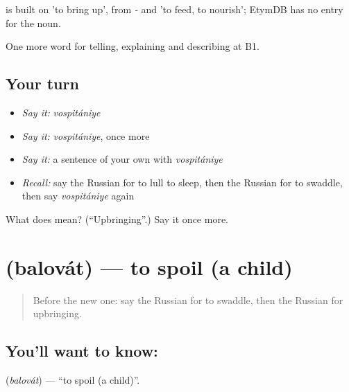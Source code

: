 \begin{cousinweb}
\emph{} is built on \emph{} 'to bring up', from \emph{-} and \emph{} 'to feed, to nourish'; EtymDB has no entry for the noun.
\end{cousinweb}

\begin{grammarlens}[title={What you've built}]
One more word for telling, explaining and describing at B1.
\end{grammarlens}

\subsection*{Your turn}
\begin{itemize}
\raggedright
  \item \emph{Say it:} \emph{vospitániye}
  \item \emph{Say it:} \emph{vospitániye}, once more
  \item \emph{Say it:} a sentence of your own with \emph{vospitániye}
  \item \emph{Recall:} say the Russian for to lull to sleep, then the Russian for to swaddle, then say \emph{vospitániye} again
\end{itemize}

\begin{tcolorbox}[breakable,colback=teal!4,colframe=teal!35!black,title={Before you move on}]
What does  mean? (\textquotedblleft{}Upbringing\textquotedblright{}.) Say it once more.
\end{tcolorbox}
\section[\texorpdfstring{\ru{баловать} (balovát)}{баловать (balovát)}]{ (balovát) — to spoil (a child)}

\label{lesson:RU-C497-balovat}



\begin{quote}
Before the new one: say the Russian for to swaddle, then the Russian for upbringing.
\end{quote}

\subsection*{You'll want to know: }
\textbf{} (\emph{balovát}) — \textquotedblleft{}to spoil (a child)\textquotedblright{}.

